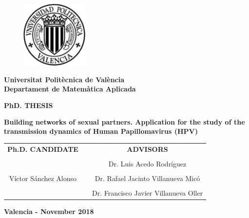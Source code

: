 \thispagestyle{empty}

\begin{figure}[h]
  	\centering
  	 \includegraphics[width=0.3\textwidth]{IMG/escudo_upv_transp.pdf}
\end{figure}
\begin{center}
\textbf{\normalsize Universitat Polit\`{e}cnica de Val\`{e}ncia}\\
\textbf{\normalsize Departament de Matem\`{a}tica Aplicada}

\vspace{1cm}

\scriptsize{\textbf{PhD. THESIS}}

\vspace{0.5cm}

\begin{center}
\textbf{\Huge Building networks of sexual partners. Application for the study of the transmission dynamics of Human Papillomavirus (HPV)}
\end{center}

\vspace{3cm}

\begin{tabular}{ccc}
\textbf{Ph.D. CANDIDATE} 				& \hspace{0.7cm} &\textbf{ADVISORS} \\
 										& \hspace{0.7cm} &\\
 										& \hspace{0.7cm} &\normalsize{Dr. Luis Acedo Rodr\'{i}guez \hfill} \\
										& \hspace{0.7cm} &\\
\normalsize{V\'{i}ctor S\'{a}nchez Alonso} 	& \hspace{0.7cm} & \normalsize{Dr. Rafael Jacinto Villanueva Mic\'{o} \hfill } \\ 
										& \hspace{0.7cm} &\\
 										& \hspace{0.7cm} & \normalsize{Dr. Francisco Javier Villanueva Oller \hfill} \\ 
\end{tabular} 

\vspace{2cm}

\normalsize{\textbf{Valencia - November 2018}}

\end{center}
